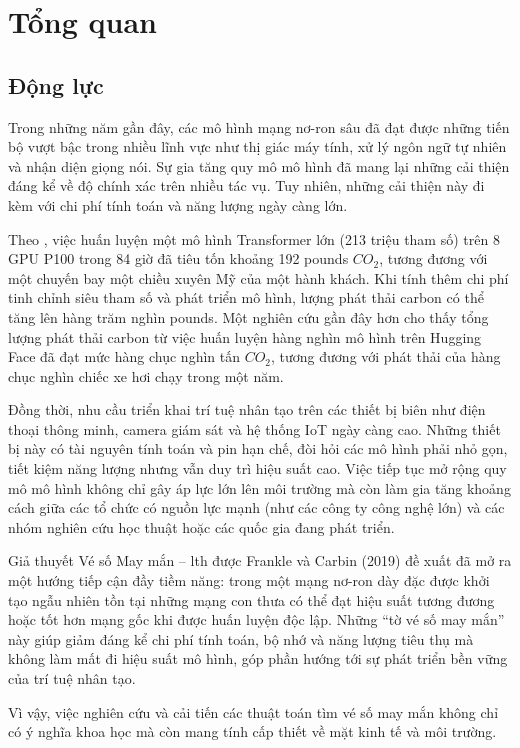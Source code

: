 \chapter{Tổng quan}
\section{Động lực}
Trong những năm gần đây, các mô hình mạng nơ-ron sâu đã đạt được những tiến bộ vượt bậc trong nhiều lĩnh vực như thị giác máy tính, xử lý ngôn ngữ tự nhiên và nhận diện giọng nói. Sự gia tăng quy mô mô hình đã mang lại những cải thiện đáng kể về độ chính xác trên nhiều tác vụ. Tuy nhiên, những cải thiện này đi kèm với chi phí tính toán và năng lượng ngày càng lớn.

Theo \cite{strubell2019energy}, việc huấn luyện một mô hình Transformer lớn (213 triệu tham số) trên 8 GPU P100 trong 84 giờ đã tiêu tốn khoảng 192 pounds $CO_2$, tương đương với một chuyến bay một chiều xuyên Mỹ của một hành khách. Khi tính thêm chi phí tinh chỉnh siêu tham số và phát triển mô hình, lượng phát thải carbon có thể tăng lên hàng trăm nghìn pounds. Một nghiên cứu gần đây hơn \cite{2026arXiv260501549W} cho thấy tổng lượng phát thải carbon từ việc huấn luyện hàng nghìn mô hình trên Hugging Face đã đạt mức hàng chục nghìn tấn $CO_2$, tương đương với phát thải của hàng chục nghìn chiếc xe hơi chạy trong một năm.

Đồng thời, nhu cầu triển khai trí tuệ nhân tạo trên các thiết bị biên như điện thoại thông minh, camera giám sát và hệ thống IoT ngày càng cao. Những thiết bị này có tài nguyên tính toán và pin hạn chế, đòi hỏi các mô hình phải nhỏ gọn, tiết kiệm năng lượng nhưng vẫn duy trì hiệu suất cao. Việc tiếp tục mở rộng quy mô mô hình không chỉ gây áp lực lớn lên môi trường mà còn làm gia tăng khoảng cách giữa các tổ chức có nguồn lực mạnh (như các công ty công nghệ lớn) và các nhóm nghiên cứu học thuật hoặc các quốc gia đang phát triển.

Giả thuyết Vé số May mắn -- \gls{lth} được Frankle và Carbin (2019) đề xuất đã mở ra một hướng tiếp cận đầy tiềm năng: trong một mạng nơ-ron dày đặc được khởi tạo ngẫu nhiên tồn tại những mạng con thưa có thể đạt hiệu suất tương đương hoặc tốt hơn mạng gốc khi được huấn luyện độc lập. Những “tờ vé số may mắn” này giúp giảm đáng kể chi phí tính toán, bộ nhớ và năng lượng tiêu thụ mà không làm mất đi hiệu suất mô hình, góp phần hướng tới sự phát triển bền vững của trí tuệ nhân tạo.

Vì vậy, việc nghiên cứu và cải tiến các thuật toán tìm vé số may mắn không chỉ có ý nghĩa khoa học mà còn mang tính cấp thiết về mặt kinh tế và môi trường.

